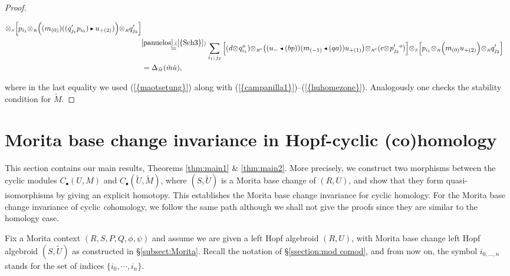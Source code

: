 \documentclass[reqno, a4paper, 10pt]{amsart}
\numberwithin{equation}{section}
\theoremstyle{plain}
\theoremstyle{definition}
\theoremstyle{remark}
\begin{document}
\begin{proof}
\begin{footnotesize}
\begin{equation*}
\begin{split}
 {\otimes_{\scriptscriptstyle{{S}}}}{\left[\underset{}{} { p_{i_1}{\otimes_{\scriptscriptstyle{{R}}}} \Big( (m_{(0)})((q'_{j_1}p_{i_0}){{\,\raise1pt\hbox{$\scriptscriptstyle{\blacktriangleright}$} \, }} u_{+(2)})\Big){\otimes_{\scriptscriptstyle{{R}}}}q_{j_2}' } \right]}
\\ 
& \!\! \overset{\eqref{panuelos}, {{\rm (}\ref{{Sch3}}{\rm )}}}{=}  
\sum_{i_1; \, j_2} {\left[\underset{}{} { (d{\otimes_{\scriptscriptstyle{{}}}}q_{i_1}^o){\otimes_{\scriptscriptstyle{{\scriptscriptstyle{{R^{\rm e}}}}}}}{\big( {(u_-{{\,\raise1pt\hbox{$\scriptscriptstyle{\blacktriangleleft}$} \, }} (bp))(m_{(-1)} {{\,\raise1pt\hbox{$\scriptscriptstyle{\blacktriangleleft}$} \, }} (qa))u_{+(1)}} \big)}{\otimes_{\scriptscriptstyle{{\scriptscriptstyle{{R^{\rm e}}}}}}} (c{\otimes_{\scriptscriptstyle{{}}}}p_{j_2}'{}^o)} \right]} {\otimes_{\scriptscriptstyle{{S}}}}{\left[\underset{}{} { p_{i_1}{\otimes_{\scriptscriptstyle{{R}}}} \Big( m_{(0)}u_{+(2)}\Big){\otimes_{\scriptscriptstyle{{R}}}}q_{j_2}' } \right]} \\
&= \Delta_{{\tilde{{\scriptscriptstyle{M}}}}}({\tilde{{m}}}{\tilde{{u}}}),  
\end{split}
\end{equation*}
\end{footnotesize}
where in the last equality we used {{\rm (}\ref{{maotsetung}}{\rm )}} along with {{\rm (}\ref{{campanilla1}}{\rm )}}--{{\rm (}\ref{{huhomezone}}{\rm )}}. 
Analogously one checks the stability condition for ${\tilde{{M}}}$.
\end{proof}

\section{Morita base change invariance in Hopf-cyclic (co)homology}
This section contains our main results, Theorems \ref{thm:main1} \& \ref{thm:main2}. More precisely, 
we construct two morphisms between the cyclic modules $C_{{\scriptscriptstyle{\bullet}}}(U, M)$ and $C_{{\scriptscriptstyle{\bullet}}}(\tilde{U}, \tilde{M})$, 
where $(S, \tilde{U})$ is a Morita base change of $(R,U)$, and show that they form quasi-isomorphisms 
by giving an explicit homotopy. This establishes the Morita base change invariance for cyclic homology.  
For the Morita base change invariance of cyclic {\em co}homology, we follow the same path although we shall not give the proofs  
since they are similar to the homology case. 

Fix a Morita context $(R, S, P, Q, \phi, \psi)$ and assume we are given a left Hopf algebroid $(R, U)$, with 
Morita base change left Hopf algebroid  $(S, \tilde{U})$ as constructed in \S\ref{subsect:Morita}. 
Recall the notation of \S\ref{ssection:mod comod}, and from now on, 
the symbol  $i_{0,\ldots,n}$ stands for the set of indices $\{i_0,\cdots,i_n\}$.
\end{document}
